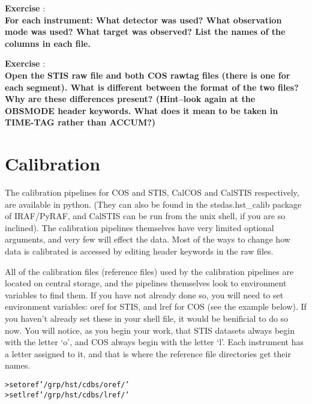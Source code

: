 {\bf \color{blue} Exercise  }:  \\
{\bf For each instrument: What detector was used? What observation mode was used? What target was observed? List the names of the columns in each file.}

{\bf \color{blue} Exercise  }:  \\
{\bf Open the STIS raw file and both COS rawtag files (there is one for each segment). What is different between the format of the two files? Why are these differences present? (Hint--look again at the OBSMODE header keywords. What does it mean to be taken in TIME-TAG rather than ACCUM?)}

\section{Calibration}
The calibration pipelines for COS and STIS, CalCOS and CalSTIS respectively, are available in python. (They can also be found in the stsdas.hst\_calib package of IRAF/PyRAF, and CalSTIS can be run from the unix shell, if you are so inclined). The calibration pipelines themselves have very limited optional arguments, and very few will effect the data. Most of the ways to change how data is calibrated is accessed by editing header keywords in the raw files. 

All of the calibration files (reference files) used by the calibration pipelines are located on central storage, and the pipelines themselves look to environment variables to find them. If you have not already done so, you will need to set environment variables: oref for STIS, and lref for COS (see the example below). If you haven't already set these in your shell file, it would be benificial to do so now. You will notice, as you begin your work, that STIS datasets always begin with the letter `o', and COS always begin with the letter `l'.  Each instrument has a letter assigned to it, and that is where the reference file directories get their names.
\begin{alltt}
> set oref '/grp/hst/cdbs/oref/'
> set lref '/grp/hst/cdbs/lref/'
\end{alltt}


